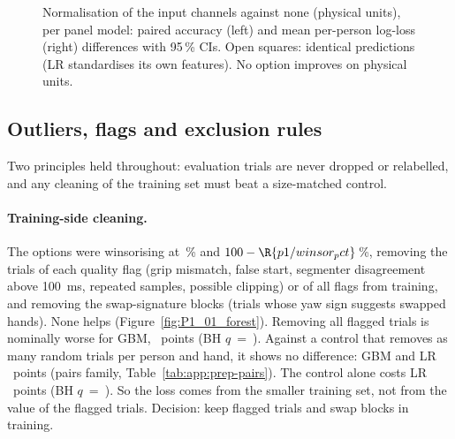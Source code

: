 \begin{figure}[htbp]
\centering
{}
\caption{Normalisation of the input channels against none (physical units), per panel model: paired
accuracy (left) and mean per-person log-loss (right) differences with 95\,\% CIs. Open squares: identical
predictions (LR standardises its own features). No option improves on physical units.}
\label{fig:P1_05_normalisation}\label{fig:app:prep-normalisation}
\end{figure}

\subsection{Outliers, flags and exclusion rules}\label{app:prep:exclusions}

Two principles held throughout: evaluation trials are never dropped or relabelled, and any cleaning of the
training set must beat a size-matched control.

\paragraph{Training-side cleaning.} The options were winsorising at \,\% and
$100 - \R{p1/winsor_pct}$\,\%, removing the trials of each quality flag (grip mismatch, false start,
segmenter disagreement above 100~ms, repeated samples, possible clipping) or of all flags from training,
and removing the swap-signature blocks (trials whose yaw sign suggests swapped hands). None helps
(Figure~\ref{fig:P1_01_forest}). Removing all flagged trials is nominally worse for GBM,
~points (BH $q$~=~). Against a control that removes
as many random trials per person and hand, it shows no difference: GBM
 and LR ~points (pairs family,
Table~\ref{tab:app:prep-pairs}). The control alone costs LR ~points
(BH $q$~=~). So the loss comes from the smaller training set, not from
the value of the flagged trials. Decision: keep flagged trials and swap blocks in training.


